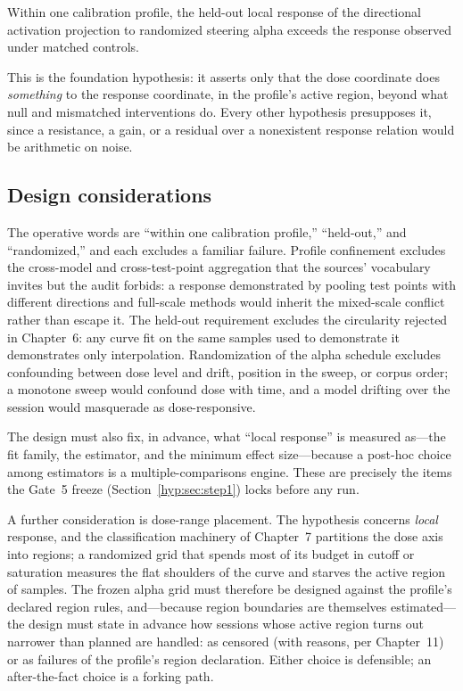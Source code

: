 \begin{hypothesis}\label{hyp:hyp:localresponse}
Within one calibration profile, the held-out local response of the directional activation projection to randomized steering alpha exceeds the response observed under matched controls.
\end{hypothesis}

This is the foundation hypothesis: it asserts only that the dose coordinate does \emph{something} to the response coordinate, in the profile's active region, beyond what null and mismatched interventions do. Every other hypothesis presupposes it, since a resistance, a gain, or a residual over a nonexistent response relation would be arithmetic on noise.

\subsection{Design considerations}

The operative words are ``within one calibration profile,'' ``held-out,'' and ``randomized,'' and each excludes a familiar failure. Profile confinement excludes the cross-model and cross-test-point aggregation that the sources' vocabulary invites but the audit forbids: a response demonstrated by pooling test points with different directions and full-scale methods would inherit the mixed-scale conflict rather than escape it. The held-out requirement excludes the circularity rejected in Chapter~6: any curve fit on the same samples used to demonstrate it demonstrates only interpolation. Randomization of the alpha schedule excludes confounding between dose level and drift, position in the sweep, or corpus order; a monotone sweep would confound dose with time, and a model drifting over the session would masquerade as dose-responsive.

The design must also fix, in advance, what ``local response'' is measured as---the fit family, the estimator, and the minimum effect size---because a post-hoc choice among estimators is a multiple-comparisons engine. These are precisely the items the Gate~5 freeze (Section~\ref{hyp:sec:step1}) locks before any run.

A further consideration is dose-range placement. The hypothesis concerns \emph{local} response, and the classification machinery of Chapter~7 partitions the dose axis into regions; a randomized grid that spends most of its budget in cutoff or saturation measures the flat shoulders of the curve and starves the active region of samples. The frozen alpha grid must therefore be designed against the profile's declared region rules, and---because region boundaries are themselves estimated---the design must state in advance how sessions whose active region turns out narrower than planned are handled: as censored (with reasons, per Chapter~11) or as failures of the profile's region declaration. Either choice is defensible; an after-the-fact choice is a forking path.

